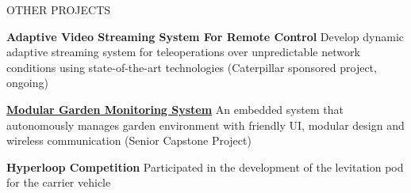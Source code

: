 \documentclass{lib/resume} %
\begin{document}
\begin{rSection}{OTHER PROJECTS}
    \vspace{-1em}
    \item {\textbf{Adaptive Video Streaming System For Remote Control}} {Develop dynamic adaptive streaming system for teleoperations over unpredictable network conditions using state-of-the-art technologies (Caterpillar sponsored project, ongoing)}
    \item \href{https://github.com/liu2g/mgms}{\textbf{Modular Garden Monitoring System}} {An embedded system that autonomously manages garden environment with friendly UI, modular design and wireless communication (Senior Capstone Project)}
    \item \textbf{Hyperloop Competition} {Participated in the development of the levitation pod for the carrier vehicle}

\end{rSection}

%
%
%
%
%
\end{document}
